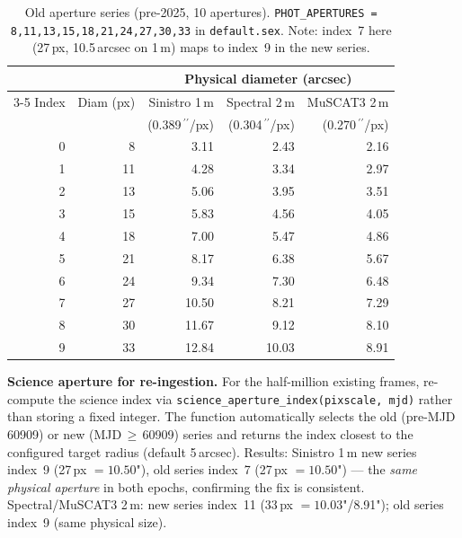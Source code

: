\documentclass[12pt,a4paper]{article}
\begin{document}
\begin{table}[h!]
\centering
\small
\begin{tabular}{rr rrr}
\toprule
 & & \multicolumn{3}{c}{Physical diameter (arcsec)} \\
\cmidrule(lr){3-5}
Index & Diam (px) & Sinistro 1\,m & Spectral 2\,m & MuSCAT3 2\,m \\
      &           & (0.389\,\ensuremath{^{\prime\prime}}/px) & (0.304\,\ensuremath{^{\prime\prime}}/px) & (0.270\,\ensuremath{^{\prime\prime}}/px) \\
\midrule
  0 &  8 &  3.11 &  2.43 &  2.16 \\
  1 & 11 &  4.28 &  3.34 &  2.97 \\
  2 & 13 &  5.06 &  3.95 &  3.51 \\
  3 & 15 &  5.83 &  4.56 &  4.05 \\
  4 & 18 &  7.00 &  5.47 &  4.86 \\
  5 & 21 &  8.17 &  6.38 &  5.67 \\
  6 & 24 &  9.34 &  7.30 &  6.48 \\
  7 & 27 & 10.50 &  8.21 &  7.29 \\
  8 & 30 & 11.67 &  9.12 &  8.10 \\
  9 & 33 & 12.84 & 10.03 &  8.91 \\
\bottomrule
\end{tabular}
\caption{Old aperture series (pre-2025, 10 apertures).
  \texttt{PHOT\_\hspace{0pt}APERTURES = 8,11,13,15,18,21,24,27,30,33} in
  \texttt{default.sex}.  Note: index~7 here (27\,px, 10.5\,arcsec on 1\,m)
  maps to index~9 in the new series.}
\label{tab:aper-old}
\end{table}

\begin{notebox}
\textbf{Science aperture for re-ingestion.}  For the half-million existing
frames, re-compute the science index via
\texttt{science\_\hspace{0pt}aperture\_\hspace{0pt}index(pixscale, mjd)} rather than storing a fixed
integer.  The function automatically selects the old (pre-MJD\,60909) or new
(MJD\,$\geq$\,60909) series and returns the index closest to the configured
target radius (default 5\,arcsec).  Results: Sinistro 1\,m new series
index~9 (27\,px $= 10.50$"), old series index~7 (27\,px $= 10.50$") ---
the \emph{same physical aperture} in both epochs, confirming the fix is
consistent.  Spectral/MuSCAT3 2\,m: new series index~11
(33\,px $= 10.03$"/8.91"); old series index~9 (same physical size).
\end{notebox}
\end{document}
